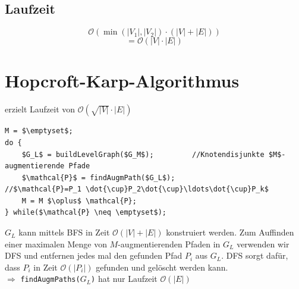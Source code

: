  \subsection{Laufzeit}
 \[ \mathcal{O}\left( \min(|V_1|,|V_2|)\cdot(|V|+|E|) \right)\]
 \[ =\mathcal{O}(|V|\cdot|E|) \]
 \section{Hopcroft-Karp-Algorithmus}
 erzielt Laufzeit von $\mathcal{O}(\sqrt{|V|}\cdot |E|)$\\
 \begin{lstlisting}[style = pseudo]
M = $\emptyset$;
do {
	$G_L$ = buildLevelGraph($G_M$);			//Knotendisjunkte $M$-augmentierende Pfade
	$\mathcal{P}$ = findAugmPath($G_L$);				//$\mathcal{P}=P_1 \dot{\cup}P_2\dot{\cup}\ldots\dot{\cup}P_k$
	M = M $\oplus$ \mathcal{P};
} while($\mathcal{P} \neq \emptyset$);
 \end{lstlisting}
 $G_L$ kann mittels BFS in Zeit $\mathcal{O} (|V|+|E|)$ konstruiert werden. Zum Auffinden einer maximalen Menge von $M$-augmentierenden Pfaden in $G_L$ verwenden wir DFS und entfernen jedes mal den gefunden Pfad $P_i$ aus $G_L$. DFS sorgt dafür, dass $P_i$ in Zeit $\mathcal{O}(|P_i|)$ gefunden und gelöscht werden kann.\\
 $\Rightarrow$ \texttt{findAugmPaths($G_L$)} hat nur Laufzeit $\mathcal{O}(|E|)$